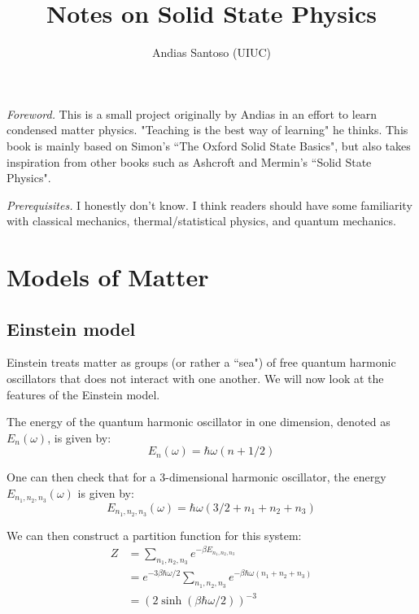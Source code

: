 \documentclass[12pt]{article}
\title{Notes on Solid State Physics}
\author{Andias Santoso (UIUC)}
\begin{document}
\maketitle

\vspace{0.5 in}

\textit{Foreword.} This is a small project originally by Andias in an effort to learn condensed matter physics. "Teaching is the best way of learning" he thinks. This book is mainly based on Simon's ``The Oxford Solid State Basics", but also takes inspiration from other books such as Ashcroft and Mermin's ``Solid State Physics". 

\vspace{0.25 in}

\textit{Prerequisites.} I honestly don't know. I think readers should have some familiarity with classical mechanics, thermal/statistical physics, and quantum mechanics.


\newpage
\tableofcontents

\newpage

\section{Models of Matter}

\subsection{Einstein model}

Einstein treats matter as groups (or rather a ``sea") of free quantum harmonic oscillators that does not interact with one another. We will now look at the features of the Einstein model.

\vspace{0.25 in}

The energy of the quantum harmonic oscillator in one dimension, denoted as $E_n(\omega)$, is given by:
\begin{equation*}
    E_n(\omega)=\hbar \omega(n+1/2)
\end{equation*}

One can then check that for a 3-dimensional harmonic oscillator, the energy $E_{n_1,n_2,n_3}(\omega)$ is given by:
\begin{equation*}
    E_{n_1,n_2,n_3}(\omega)=\hbar\omega(3/2+n_1+n_2+n_3)
\end{equation*}

We can then construct a partition function for this system:
\begin{align*}
    Z&=\sum_{n_1,n_2,n_3}e^{-\beta E_{n_1,n_2,n_3}}\\
    &=e^{-3\beta\hbar\omega/2}\sum_{n_1,n_2,n_3}e^{-\beta\hbar\omega(n_1+n_2+n_3)}\\
    &=(2\sinh{(\beta\hbar\omega/2)})^{-3}
\end{align*}
\end{document}
